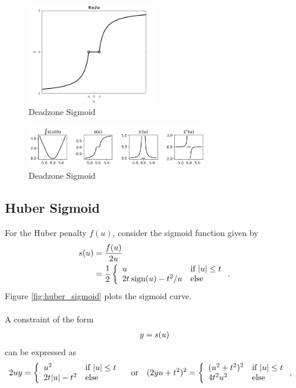 \documentclass{article}
\begin{document}
        \begin{figure}[h!]
            \centering
            \includegraphics[width=0.5\textwidth]{./figs/nn/deadzone_sigmoid.png}
            \caption{Deadzone Sigmoid}
            \label{fig:deadzone_sigmoid}
        \end{figure}
        \begin{figure}[h!]
            \centering
            \includegraphics[width=0.7\textwidth]{./figs/nn/sig/deadzone.png}
            \caption{Deadzone Sigmoid}
            \label{fig:sig_deadzone}
        \end{figure}

\subsection{Huber Sigmoid}
    For the Huber penalty $f(u)$, 
    consider the sigmoid function given by
    \begin{align}
        s(u)&=\frac{f(u)}{2u}\nonumber\\
        &=\frac{1}{2}
        \left\{\begin{array}{lllllllllllllllllll}u & \text{if $|u|\leq t$} \\ 2t\:\text{sign}(u)-t^2/u & \text{else}\end{array}\right..
    \end{align}
    Figure \ref{fig:huber_sigmoid} plots the sigmoid curve.\\
    \\
    A constraint of the form
    \begin{align*}
        y=s(u)
    \end{align*}
    can be expressed as
    \begin{align*}
        2uy&=
        \left\{\begin{array}{lllllllllllllllllll}u^2 & \text{if $|u|\leq t$} \\ 2t|u|-t^2 & \text{else}\end{array}\right.
        \quad\text{or}\quad
        (2yu+t^2)^2=
        \left\{\begin{array}{lllllllllllllllllll}(u^2+t^2)^2 & \text{if $|u|\leq t$} \\ 4t^2u^2 & \text{else}\end{array}\right.,
    \end{align*}
    
\end{document}
